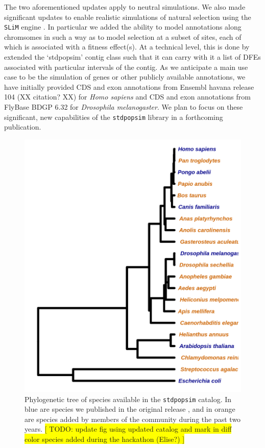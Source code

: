 \documentclass[hidelinks]{article}
\newcommand{\stdpopsim}{\texttt{stdpopsim}\xspace}
\begin{document}
The two aforementioned updates apply to neutral simulations. 
We also made significant updates to enable realistic simulations of natural selection
using the \texttt{SLiM} engine \citep{Haller2019}. In particular we added the ability to
model annotations along chromsomes in such a way as to model selection at a subset of sites,
each of which is associated with a fitness effect(s). At a technical level, this is done
by extended the `stdpopsim' contig class such that it can carry with it a list of DFEs
associated with particular intervals of the contig. As we anticipate a main use case
to be the simulation of genes or other publicly available annotations, we have initially
provided CDS and exon annotations from Ensembl havana release 104 (XX citation? XX) 
for \emph{Homo sapiens} and CDS and exon annotations from FlyBase BDGP 6.32
for \emph{Drosophila melanogaster}. We plan to focus on these significant, new
capabilities of the \stdpopsim library in a forthcoming publication. 





\begin{figure}
	\includegraphics[width=\linewidth]{./figs/species_fig.png}
	\caption{Phylogenetic tree of species available in the \stdpopsim catalog. 
		In blue are species we published in the original release \citep{Adrion2020}, and in orange are species added by members of the community during the past two years. 
		\colorbox{yellow}{[ TODO: update fig using updated catalog and mark in diff color species added during the hackathon (Elise?) ]}}
	\label{fig:tree}
\end{figure}
\end{document}

